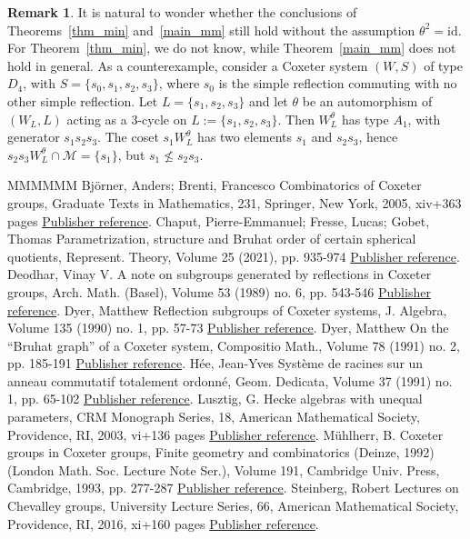 \documentclass[11pt]{article}
\theoremstyle{definition}
\newtheorem{rema}[theo]{Remark}
\numberwithin{equation}{section}
\newcommand{\M}{{\mathcal{M}}}
\begin{document}
\begin{rema}
	It is natural to wonder whether the conclusions of Theorems~\ref{thm_min} and~\ref{main_mm} still hold without the assumption $\theta^2=\mathrm{id}$. For Theorem~\ref{thm_min}, we do not know, while Theorem~\ref{main_mm} does not hold in general. As a counterexample, consider a Coxeter system $(W,S)$ of type $D_4$, with $S=\{s_0, s_1, s_2, s_3\}$, where $s_0$ is the simple reflection commuting with no other simple reflection. Let $L=\{s_1, s_2, s_3\}$ and let $\theta$ be an automorphism of $(W_L, L)$ acting as a $3$-cycle on $L:=\{s_1, s_2, s_3\}$. Then $W_L^\theta$ has type $A_1$, with generator $s_1 s_2 s_3$. The coset $s_1 W_L^\theta$ has two elements $s_1$ and $s_2 s_3$, hence $s_2 s_3 W_L^\theta \cap \M=\{s_1\}$, but $s_1 \not\leq s_2 s_3$. 
\end{rema}

\begin{thebibliography}{MMMMMM}
 Björner, Anders; Brenti, Francesco Combinatorics of Coxeter groups, Graduate Texts in Mathematics, 231, Springer, New York, 2005, xiv+363 pages \href{https://alco.centre-mersenne.org/articles/10.5802/alco.394/#BB}{Publisher reference}.
 Chaput, Pierre-Emmanuel; Fresse, Lucas; Gobet, Thomas Parametrization, structure and Bruhat order of certain spherical quotients, Represent. Theory, Volume 25 (2021), pp. 935-974 \href{https://alco.centre-mersenne.org/articles/10.5802/alco.394/#CFG}{Publisher reference}.
 Deodhar, Vinay V. A note on subgroups generated by reflections in Coxeter groups, Arch. Math. (Basel), Volume 53 (1989) no. 6, pp. 543-546 \href{https://alco.centre-mersenne.org/articles/10.5802/alco.394/#Deodhar}{Publisher reference}.
 Dyer, Matthew Reflection subgroups of Coxeter systems, J. Algebra, Volume 135 (1990) no. 1, pp. 57-73 \href{https://alco.centre-mersenne.org/articles/10.5802/alco.394/#Dyer_subgroups}{Publisher reference}.
 Dyer, Matthew On the “Bruhat graph” of a Coxeter system, Compositio Math., Volume 78 (1991) no. 2, pp. 185-191 \href{https://alco.centre-mersenne.org/articles/10.5802/alco.394/#Dyer_Bruhat}{Publisher reference}.
 Hée, Jean-Yves Système de racines sur un anneau commutatif totalement ordonné, Geom. Dedicata, Volume 37 (1991) no. 1, pp. 65-102 \href{https://alco.centre-mersenne.org/articles/10.5802/alco.394/#Hee_1}{Publisher reference}.
 Lusztig, G. Hecke algebras with unequal parameters, CRM Monograph Series, 18, American Mathematical Society, Providence, RI, 2003, vi+136 pages \href{https://alco.centre-mersenne.org/articles/10.5802/alco.394/#Lus_book}{Publisher reference}.
 Mühlherr, B. Coxeter groups in Coxeter groups, Finite geometry and combinatorics (Deinze, 1992) (London Math. Soc. Lecture Note Ser.), Volume 191, Cambridge Univ. Press, Cambridge, 1993, pp. 277-287 \href{https://alco.centre-mersenne.org/articles/10.5802/alco.394/#muhlh}{Publisher reference}.
 Steinberg, Robert Lectures on Chevalley groups, University Lecture Series, 66, American Mathematical Society, Providence, RI, 2016, xi+160 pages \href{https://alco.centre-mersenne.org/articles/10.5802/alco.394/#Steinberg}{Publisher reference}.
\end{thebibliography}
\end{document}
